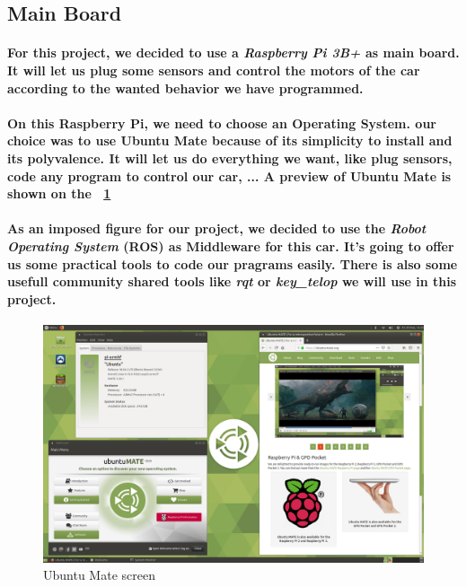 
\subsection{Main Board}
\paragraph{For this project, we decided to use a \textit{Raspberry Pi 3B+}
as main board. It will let us plug some sensors and control the motors of
the car according to the wanted behavior we have programmed.}

\paragraph{On this Raspberry Pi, we need to choose an Operating System. our
choice was to use Ubuntu Mate because of its simplicity to install and its 
polyvalence. It will let us do everything we want, like plug sensors, code
any program to control our car, ... A preview of Ubuntu Mate is shown on
the ~\ref{fig:ubuntu}}

\paragraph{As an imposed figure for our project, we decided to use the 
\textit{Robot Operating System} (ROS) as Middleware for this car. It's
going to offer us some practical tools to code our pragrams easily.
There is also some usefull community shared tools like \textit{rqt}
or \textit{key\_telop} we will use in this project.}

\begin{figure}[h!]
    \begin{center}
        \includegraphics[scale=0.3]{Images/Ubuntu_mate.png}
    \end{center}
    \caption{Ubuntu Mate screen}
    \label{fig:ubuntu}
\end{figure}


